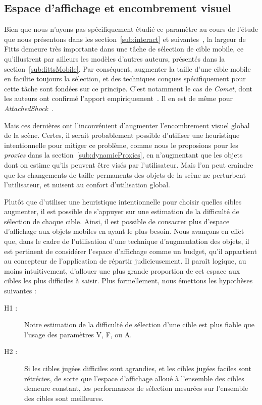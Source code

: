 	
	\subsection{Espace d'affichage et encombrement visuel}
	Bien que nous n'ayons pas spécifiquement étudié ce paramètre au cours de l'étude que nous présentons dans les section~\ref{sub:interact} et suivantes~\cite{kouyoumdjian2015characterizing}, la largeur de Fitts demeure très importante dans une tâche de sélection de cible mobile, ce qu'illustrent par ailleurs les modèles d'autres auteurs, présentés dans la section~\ref{sub:fittsMobile}. Par conséquent, augmenter la taille d'une cible mobile en facilite toujours la sélection, et des techniques conçues spécifiquement pour cette tâche sont fondées sur ce principe. C'est notamment le cas de \emph{Comet}, dont les auteurs ont confirmé l'apport empiriquement~\cite{hasan2011comet}. Il en est de même pour \emph{AttachedShock}~\cite{you2012attachedshock, you2014attachedshock}.
	
	Mais ces dernières ont l'inconvénient d'augmenter l'encombrement visuel global de la scène. Certes, il serait probablement possible d'utiliser une heuristique intentionnelle pour mitiger ce problème, comme nous le proposions pour les \emph{proxies} dans la section~\ref{sub:dynamicProxies}, en n'augmentant que les objets dont on estime qu'ils peuvent être visés par l'utilisateur. Mais l'on peut craindre que les changements de taille permanents des objets de la scène ne perturbent l'utilisateur, et nuisent au confort d'utilisation global.
	
	Plutôt que d'utiliser une heuristique intentionnelle pour choisir quelles cibles augmenter, il est possible de s'appuyer sur une estimation de la difficulté de sélection de chaque cible. Ainsi, il est possible de consacrer plus d'espace d'affichage aux objets mobiles en ayant le plus besoin. Nous avançons en effet que, dans le cadre de l'utilisation d'une technique d'augmentation des objets, il est pertinent de considérer l'espace d'affichage comme un budget, qu'il appartient au concepteur de l'application de répartir judicieusement. Il paraît logique, au moins intuitivement, d'allouer une plus grande proportion de cet espace aux cibles les plus difficiles à saisir. Plus formellement, nous émettons les hypothèses suivantes :
	
	\begin{description}
		\item[H1 :] Notre estimation de la difficulté de sélection d'une cible est plus fiable que l'usage des paramètres V, F, ou A.
		\item[H2 :] Si les cibles jugées difficiles sont agrandies, et les cibles jugées faciles sont rétrécies, de sorte que l'espace d'affichage alloué à l'ensemble des cibles demeure constant, les performances de sélection mesurées sur l'ensemble des cibles sont meilleures.
	\end{description}
	
